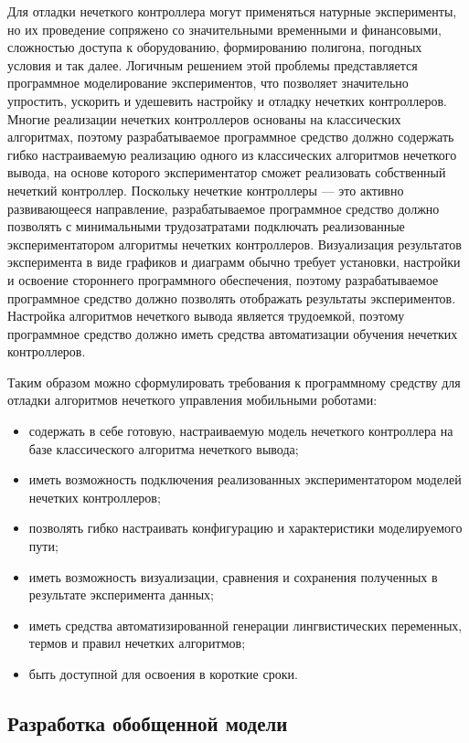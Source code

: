 Для отладки нечеткого контроллера могут применяться натурные эксперименты, но их проведение сопряжено со значительными временными и финансовыми, сложностью доступа к оборудованию, формированию полигона, погодных условия и так далее. Логичным решением этой проблемы представляется программное моделирование экспериментов, что позволяет значительно упростить, ускорить и удешевить настройку и отладку нечетких контроллеров. Многие реализации нечетких контроллеров основаны на классических алгоритмах, поэтому разрабатываемое программное средство должно содержать гибко настраиваемую реализацию одного из классических алгоритмов нечеткого вывода, на основе которого экспериментатор сможет реализовать собственный нечеткий контроллер. Поскольку нечеткие контроллеры — это активно развивающееся направление, разрабатываемое программное средство должно позволять с минимальными трудозатратами подключать реализованные экспериментатором алгоритмы нечетких контроллеров. Визуализация результатов эксперимента в виде графиков и диаграмм обычно требует установки, настройки и освоение стороннего программного обеспечения, поэтому разрабатываемое программное средство должно позволять отображать результаты экспериментов. Настройка алгоритмов нечеткого вывода является трудоемкой, поэтому программное средство должно иметь средства автоматизации обучения нечетких контроллеров.

Таким образом можно сформулировать требования к программному средству для отладки алгоритмов нечеткого управления мобильными роботами:

\begin{itemize}
  \item содержать в себе готовую, настраиваемую модель нечеткого контроллера на базе классического алгоритма нечеткого вывода;
  \item иметь возможность подключения реализованных экспериментатором моделей нечетких контроллеров;
  \item позволять гибко настраивать конфигурацию и характеристики моделируемого пути;
  \item иметь возможность визуализации, сравнения и сохранения полученных в результате эксперимента данных;
  \item иметь средства автоматизированной генерации лингвистических переменных, термов и правил нечетких алгоритмов;
  \item быть доступной для освоения в короткие сроки.
\end{itemize}

\subsection{Разработка обобщенной модели}
\label{sub:sys:2}

